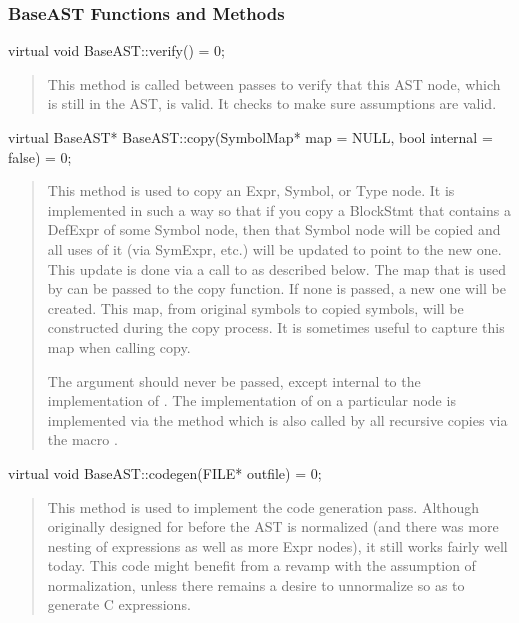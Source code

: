 \documentclass[10pt]{article}
\begin{document}
\subsubsection{BaseAST Functions and Methods}

\begin{clang}
virtual void BaseAST::verify() = 0;
\end{clang}
\begin{quote}
This method is called between passes to verify that this AST node,
which is still in the AST, is valid.  It checks to make sure
assumptions are valid.
\end{quote}

\begin{clang}
virtual BaseAST* BaseAST::copy(SymbolMap* map = NULL, bool internal = false) = 0;
\end{clang}
\begin{quote}
This method is used to copy an Expr, Symbol, or Type node.  It is
implemented in such a way so that if you copy a BlockStmt that
contains a DefExpr of some Symbol node, then that Symbol node will be
copied and all uses of it (via SymExpr, etc.) will be updated to point
to the new one.  This update is done via a call to 
as described below.  The map that is used by  can
be passed to the copy function.  If none is passed, a new one will be
created.  This map, from original symbols to copied symbols, will be
constructed during the copy process.  It is sometimes useful to
capture this map when calling copy.

The argument  should never be passed, except internal to
the implementation of .  The implementation of  on a
particular node is implemented via the method  which is
also called by all recursive copies via the macro .
\end{quote}

\begin{clang}
virtual void BaseAST::codegen(FILE* outfile) = 0;
\end{clang}
\begin{quote}
This method is used to implement the code generation pass.  Although
originally designed for before the AST is normalized (and there was
more nesting of expressions as well as more Expr nodes), it still
works fairly well today.  This code might benefit from a revamp with
the assumption of normalization, unless there remains a desire to
unnormalize so as to generate C expressions.
\end{quote}
\end{document}
